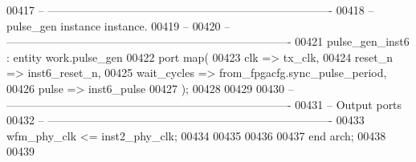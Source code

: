 \begin{DoxyCode}
00417 \textcolor{keyword}{-- ----------------------------------------------------------------------------}
00418 \textcolor{keyword}{-- pulse\_gen instance instance.}
00419 \textcolor{keyword}{-- }
00420 \textcolor{keyword}{-- ----------------------------------------------------------------------------   }
00421    pulse\_gen\_inst6 : \textcolor{keywordflow}{entity} work.pulse_gen
00422       \textcolor{keywordflow}{port} \textcolor{keywordflow}{map}(
00423       clk         => tx_clk,
00424       reset_n     => inst6_reset_n,
00425       wait_cycles => from\_fpgacfg.sync\_pulse\_period,
00426       pulse       => inst6_pulse
00427    \textcolor{vhdlchar}{)};
00428    
00429    
00430 \textcolor{keyword}{-- ----------------------------------------------------------------------------}
00431 \textcolor{keyword}{-- Output ports }
00432 \textcolor{keyword}{-- ---------------------------------------------------------------------------- }
00433    \textcolor{vhdlchar}{wfm_phy_clk}             \textcolor{vhdlchar}{<=} \textcolor{vhdlchar}{inst2_phy_clk};
00434   
00435    
00436   
00437 \textcolor{keywordflow}{end} \textcolor{vhdlchar}{arch};   
00438 
00439 
\end{DoxyCode}
